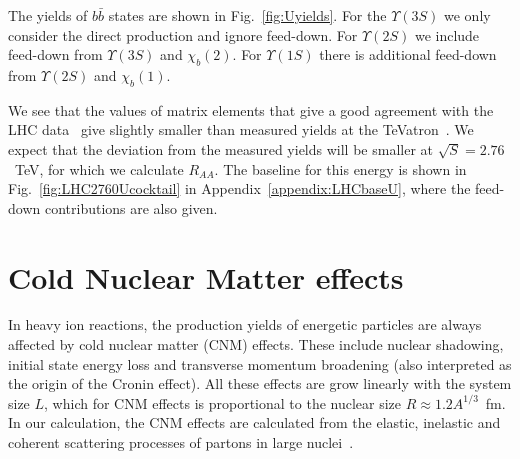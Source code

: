 \documentclass[article,showpacs,preprintnumbers,amsmath,amssymb]{revtex4}
\newcommand{\barb}{{\bar{b}}}
\begin{document}
The yields of $b\barb$ states are shown in Fig.~\ref{fig:Uyields}. For the
$\Upsilon(3S)$ we only consider the direct production and ignore feed-down.
For $\Upsilon(2S)$ we include feed-down from $\Upsilon(3S)$ and $\chi_b(2)$.
For $\Upsilon(1S)$ there is additional feed-down from $\Upsilon(2S)$ and
$\chi_b(1)$. 

We see that the values of matrix elements that give a good agreement with the
LHC data~\cite{Khachatryan:2010zg} give slightly smaller than measured yields
at the TeVatron~\cite{Acosta:2001gv}.  We expect that the deviation from the
measured yields will be smaller at $\sqrt{S}=2.76$~TeV, for which we calculate
$R_{AA}$. The baseline for this energy is shown in
Fig.~\ref{fig:LHC2760Ucocktail} in Appendix~\ref{appendix:LHCbaseU}, where the
feed-down contributions are also given.

\section{Cold Nuclear Matter  effects~\label{section:CNM}}

In heavy ion reactions, the production yields of energetic particles are always
affected by cold nuclear matter (CNM) effects.  These include nuclear
shadowing, initial state energy loss and transverse momentum broadening (also
interpreted as the origin of the Cronin effect).  All these effects are
grow linearly with the system size $L$, which for CNM effects
is proportional to the nuclear size $R\approx 1.2 A^{1/3}$~fm. In our
calculation, the CNM effects are calculated from the elastic, inelastic and
coherent scattering processes of partons in large nuclei~\cite{Vitev:2006bi}.
\end{document}
